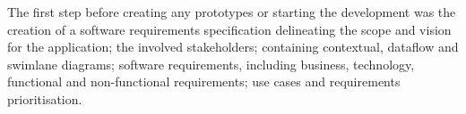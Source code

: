 The first step before creating any prototypes or starting the development was
the creation of a software requirements specification
delineating the scope and vision for the application; the involved stakeholders;
containing contextual, dataflow and swimlane diagrams; software requirements, including
business, technology, functional and non-functional requirements; use cases
and requirements prioritisation.





